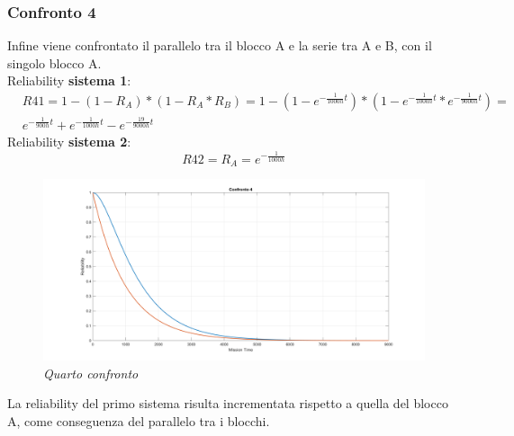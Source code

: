 \subsubsection{Confronto 4}
Infine viene confrontato il parallelo tra il blocco A e la serie tra A e B, con il singolo blocco A.
\\
Reliability \textbf{sistema 1}:
\begin{equation*}
	\begin{split}
		&R41 = 1-(1-R_A)*(1-R_A*R_B) = 1-(1-e^{-\frac{1}{1000h} t})*(1-e^{-\frac{1}{1000h} t}*e^{-\frac{1}{9000h} t}) = \\
		&e^{-\frac{1}{900h}t}+e^{-\frac{1}{1000h}t}-e^{-\frac{19}{9000h}t}
	\end{split}
\end{equation*}
Reliability \textbf{sistema 2}:
\begin{equation*}
	R42 = R_A = e^{-\frac{1}{1000h}}
\end{equation*}
\begin{figure}[H]
	\centering
	\includegraphics[width=\textwidth]{img/hw5/es4_4.png}
	\caption{\textit{Quarto confronto}}
\end{figure}
La reliability del primo sistema risulta incrementata rispetto a quella del blocco A, come conseguenza del parallelo tra i blocchi.


